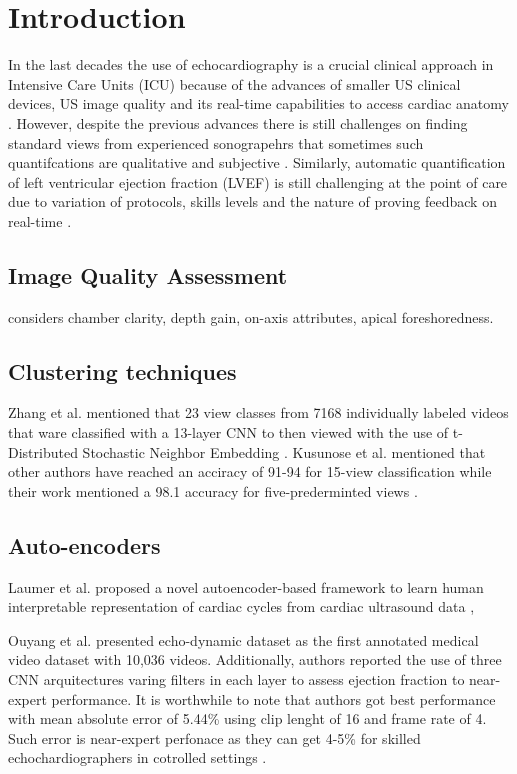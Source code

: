 \section{Introduction} \label{sec:intro}
In the last decades the use of echocardiography is a crucial clinical approach in Intensive Care Units (ICU) because of the advances of smaller US clinical devices, US image quality and its real-time capabilities to access cardiac anatomy \cite{Feigenbaum1996, Vieillard-Baron2008, singh2007, cambell2018}.
However, despite the previous advances there is still challenges on finding standard views from experienced sonograpehrs that sometimes such quantifcations are qualitative and subjective \cite{Feigenbaum1996}.
Similarly, automatic quantification of left ventricular ejection fraction (LVEF) is still challenging at the point of care due to variation of protocols, skills levels \cite{field2011} and the nature of proving feedback on real-time \cite{liu2021}.

\subsection{Image Quality Assessment}
\cite{labs2021_in_miua} considers chamber clarity, depth gain, on-axis attributes, apical foreshoredness.

\subsection{Clustering techniques}
Zhang et al. mentioned that 23 view classes from 7168 individually labeled videos that ware classified with a 13-layer CNN to then viewed with the use of t-Distributed Stochastic Neighbor Embedding \cite{zhang2018}.
Kusunose et al. mentioned that other authors have reached an acciracy of 91-94 for 15-view classification while their work mentioned a 98.1 accuracy for five-prederminted views \cite{kusunose2021}.

\subsection{Auto-encoders}
Laumer et al. proposed a novel autoencoder-based framework to learn human interpretable representation of cardiac cycles from cardiac ultrasound data \cite{laumer2020},



Ouyang et al. presented echo-dynamic dataset as the first annotated medical video dataset with 10,036 videos. 
Additionally, authors reported the use of three CNN arquitectures varing filters in each layer to assess ejection fraction to near-expert performance.
It is worthwhile to note that authors got best performance with mean absolute error of 5.44\% using clip lenght of 16 and frame rate of 4.
Such error is near-expert perfonace as they can get 4-5\% for skilled echochardiographers in cotrolled settings 
\cite{ouyang-NeuripsML4H2019}.


